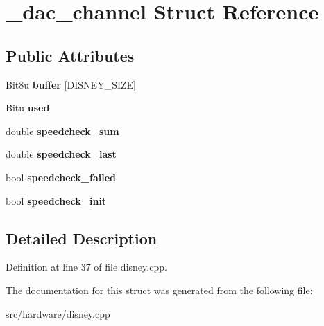 \hypertarget{struct__dac__channel}{\section{\-\_\-dac\-\_\-channel Struct Reference}
\label{struct__dac__channel}
}
\subsection*{Public Attributes}
\begin{DoxyCompactItemize}
\item 
\hypertarget{struct__dac__channel_ad93de6df3037bfceab20c548b21b9a75}{Bit8u {\bfseries buffer} \mbox{[}D\-I\-S\-N\-E\-Y\-\_\-\-S\-I\-Z\-E\mbox{]}}\label{struct__dac__channel_ad93de6df3037bfceab20c548b21b9a75}

\item 
\hypertarget{struct__dac__channel_a78be02739aed0060b758ee15809a84fc}{Bitu {\bfseries used}}\label{struct__dac__channel_a78be02739aed0060b758ee15809a84fc}

\item 
\hypertarget{struct__dac__channel_a7d0f38594438a2cc9bce52868bc70c2d}{double {\bfseries speedcheck\-\_\-sum}}\label{struct__dac__channel_a7d0f38594438a2cc9bce52868bc70c2d}

\item 
\hypertarget{struct__dac__channel_a8ba9bef4214ecacfe36a5db9bdb50e87}{double {\bfseries speedcheck\-\_\-last}}\label{struct__dac__channel_a8ba9bef4214ecacfe36a5db9bdb50e87}

\item 
\hypertarget{struct__dac__channel_a777f347b3b4f8ccffb1ca7fcdf424ed7}{bool {\bfseries speedcheck\-\_\-failed}}\label{struct__dac__channel_a777f347b3b4f8ccffb1ca7fcdf424ed7}

\item 
\hypertarget{struct__dac__channel_aa0475c376f0d89f426ea1a708c74d84a}{bool {\bfseries speedcheck\-\_\-init}}\label{struct__dac__channel_aa0475c376f0d89f426ea1a708c74d84a}

\end{DoxyCompactItemize}


\subsection{Detailed Description}


Definition at line 37 of file disney.\-cpp.



The documentation for this struct was generated from the following file\-:\begin{DoxyCompactItemize}
\item 
src/hardware/disney.\-cpp\end{DoxyCompactItemize}
